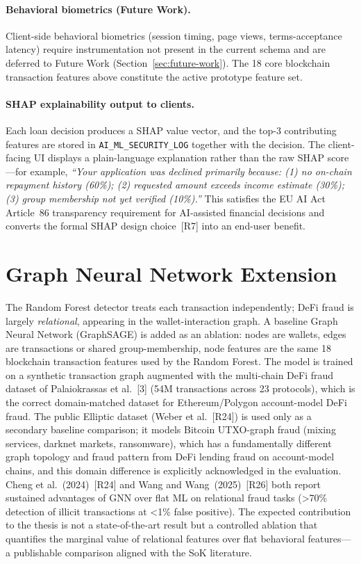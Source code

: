 \documentclass[12pt,a4paper]{report}
\begin{document}
\paragraph{Behavioral biometrics (Future Work).}
Client-side behavioral biometrics (session timing, page views, terms-acceptance latency) require instrumentation not present in the current schema and are deferred to Future Work (Section~\ref{sec:future-work}). The 18 core blockchain transaction features above constitute the active prototype feature set.

\paragraph{SHAP explainability output to clients.}
Each loan decision produces a SHAP value vector, and the top-3 contributing features are stored in \texttt{AI\_ML\_SECURITY\_LOG} together with the decision. The client-facing UI displays a plain-language explanation rather than the raw SHAP score---for example, \emph{``Your application was declined primarily because: (1) no on-chain repayment history (60\%); (2) requested amount exceeds income estimate (30\%); (3) group membership not yet verified (10\%).''} This satisfies the EU AI Act Article~86 transparency requirement for AI-assisted financial decisions and converts the formal SHAP design choice~[R7] into an end-user benefit.

\section{Graph Neural Network Extension}
\label{sec:gnn-extension}

The Random Forest detector treats each transaction independently; DeFi fraud is largely \emph{relational}, appearing in the wallet-interaction graph. A baseline Graph Neural Network (GraphSAGE) is added as an ablation: nodes are wallets, edges are transactions or shared group-membership, node features are the same 18 blockchain transaction features used by the Random Forest. The model is trained on a synthetic transaction graph augmented with the multi-chain DeFi fraud dataset of Palaiokrassas et al.~[3] (54M transactions across 23 protocols), which is the correct domain-matched dataset for Ethereum/Polygon account-model DeFi fraud. The public Elliptic dataset (Weber et al.~[R24]) is used only as a secondary baseline comparison; it models Bitcoin UTXO-graph fraud (mixing services, darknet markets, ransomware), which has a fundamentally different graph topology and fraud pattern from DeFi lending fraud on account-model chains, and this domain difference is explicitly acknowledged in the evaluation. Cheng et al.~(2024)~[R24] and Wang and Wang~(2025)~[R26] both report sustained advantages of GNN over flat ML on relational fraud tasks (>70\% detection of illicit transactions at <1\% false positive). The expected contribution to the thesis is not a state-of-the-art result but a controlled ablation that quantifies the marginal value of relational features over flat behavioral features---a publishable comparison aligned with the SoK literature.
\end{document}
